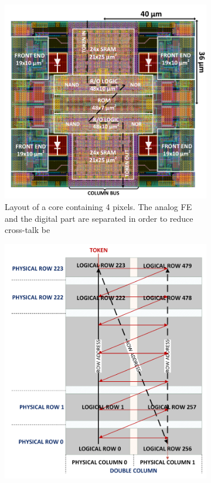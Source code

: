 \begin{figure}[h!]
    \begin{subfigure}{.5\textwidth}
    \centering
    \includegraphics[width=.98\linewidth]{figures/Monopix1/Monopix1_2x2pixelsgroup.png}
    \caption{Layout of a core containing 4 pixels. The analog FE and the digital part are separated in order to reduce cross-talk be}
    \label{fig:pixels_core}
    \end{subfigure}
    \begin{subfigure}{.5\textwidth}
    \centering
    \includegraphics[width=.88\linewidth]{figures/Monopix1/column_order.png}
    \caption{}
    \label{fig:column_order}
    \end{subfigure}
\end{figure}

